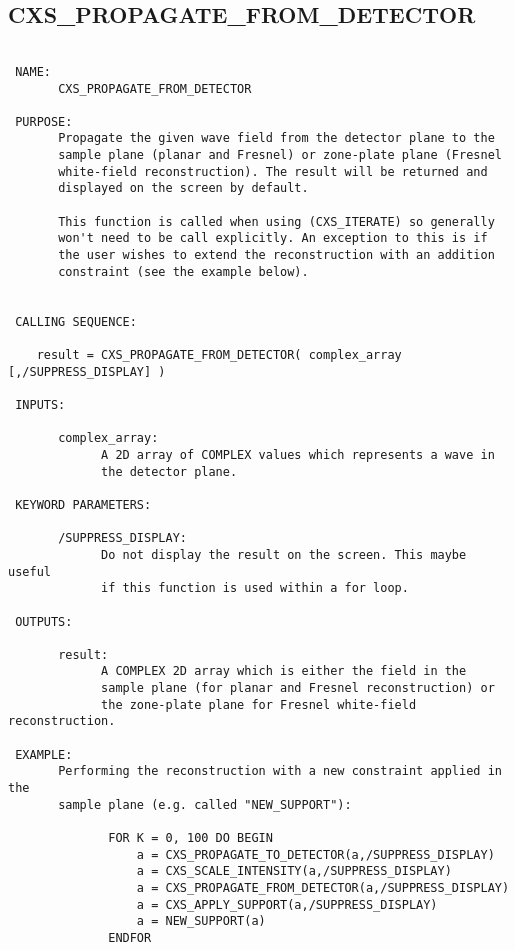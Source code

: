 \subsection{CXS\_PROPAGATE\_FROM\_DETECTOR}
\begin{verbatim}

 NAME:
       CXS_PROPAGATE_FROM_DETECTOR

 PURPOSE:
       Propagate the given wave field from the detector plane to the 
       sample plane (planar and Fresnel) or zone-plate plane (Fresnel
       white-field reconstruction). The result will be returned and
       displayed on the screen by default.

       This function is called when using (CXS_ITERATE) so generally
       won't need to be call explicitly. An exception to this is if
       the user wishes to extend the reconstruction with an addition
       constraint (see the example below).


 CALLING SEQUENCE:

	result = CXS_PROPAGATE_FROM_DETECTOR( complex_array [,/SUPPRESS_DISPLAY] )

 INPUTS:

       complex_array:
             A 2D array of COMPLEX values which represents a wave in
             the detector plane.

 KEYWORD PARAMETERS:

       /SUPPRESS_DISPLAY:
             Do not display the result on the screen. This maybe useful
             if this function is used within a for loop. 

 OUTPUTS:

       result:
             A COMPLEX 2D array which is either the field in the
             sample plane (for planar and Fresnel reconstruction) or
             the zone-plate plane for Fresnel white-field reconstruction.

 EXAMPLE:
       Performing the reconstruction with a new constraint applied in the
       sample plane (e.g. called "NEW_SUPPORT"):

              FOR K = 0, 100 DO BEGIN 
                  a = CXS_PROPAGATE_TO_DETECTOR(a,/SUPPRESS_DISPLAY)
                  a = CXS_SCALE_INTENSITY(a,/SUPPRESS_DISPLAY)
                  a = CXS_PROPAGATE_FROM_DETECTOR(a,/SUPPRESS_DISPLAY)
                  a = CXS_APPLY_SUPPORT(a,/SUPPRESS_DISPLAY)
                  a = NEW_SUPPORT(a)
              ENDFOR 


\end{verbatim}







